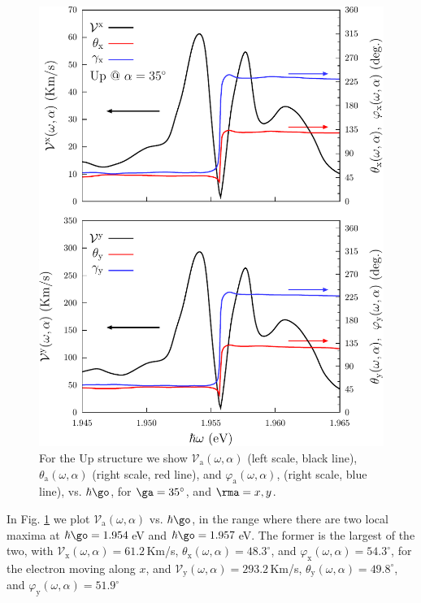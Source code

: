 \documentclass[prb,11pt,tightenlines,twocolumn,aps]{revtex4-1}
\begin{document}
\begin{figure}[t]
\centering
\includegraphics[width=\linewidth]{upplots/up-vx-vy-w2}
\caption{For the Up structure we show $\mathcal{V}_{\mathrm{a}}
(\omega,\alpha)$ (left scale, black line), $\theta_{\mathrm{a}}
(\omega,\alpha)$ (right scale, red line), and $\varphi_{\mathrm{a}}
(\omega,\alpha)$, (right scale, blue line), vs. $\hbar\go$, for
$\ga=35^\circ$, and $\rma=x,y$. }
\label{fig:up-vx-vy-w2}
\end{figure}
In Fig. \ref{fig:up-vx-vy-w2} we plot $\mathcal{V}_{\mathrm{a}}
(\omega,\alpha)$ vs. $\hbar\go$, in the range where there are two local maxima
at $\hbar\go=1.954$\,eV and $\hbar\go=1.957$\,eV.
% 
The former is the largest of the two, with
$\mathcal{V}_{\mathrm{x}} (\omega,\alpha)=61.2$\,Km/s,
$\theta_{\mathrm{x}} (\omega,\alpha)=48.3^{\circ}$, and 
$\varphi_{\mathrm{x}} (\omega,\alpha)=54.3^{\circ}$,
for the electron moving along $x$, and
$\mathcal{V}_{\mathrm{y}} (\omega,\alpha)=293.2$\,Km/s,
$\theta_{\mathrm{y}} (\omega,\alpha)=49.8^{\circ}$, and 
$\varphi_{\mathrm{y}} (\omega,\alpha)=51.9^{\circ}$
\end{document}
